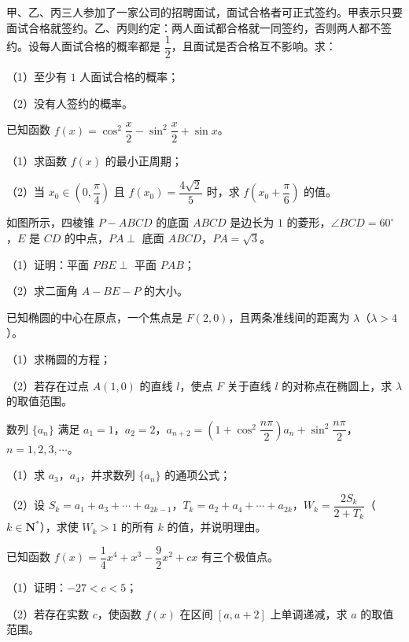 \begin{question}
甲、乙、丙三人参加了一家公司的招聘面试，面试合格者可正式签约。甲表示只要面试合格就签约。乙、丙则约定：两人面试都合格就一同签约，否则两人都不签约。设每人面试合格的概率都是 $\dfrac12$，且面试是否合格互不影响。求：

（1）至少有 $1$ 人面试合格的概率；

（2）没有人签约的概率。

\end{question}
\begin{question}
已知函数 $f(x)=\cos^2\dfrac x2-\sin^2\dfrac x2+\sin x$。

（1）求函数 $f(x)$ 的最小正周期；

（2）当 $x_0\in\left(0,\dfrac{\pi}4\right)$ 且 $f(x_0)=\dfrac{4\sqrt2}5$ 时，求 $f\left(x_0+\dfrac{\pi}6\right)$ 的值。

\Needspace{0.4\textheight}
\end{question}
\begin{question}
如图所示，四棱锥 $P-ABCD$ 的底面 $ABCD$ 是边长为 $1$ 的菱形，$\angle BCD=60^\circ$，$E$ 是 $CD$ 的中点，$PA\perp$ 底面 $ABCD$，$PA=\sqrt3$。

（1）证明：平面 $PBE\perp$ 平面 $PAB$；

（2）求二面角 $A-BE-P$ 的大小。
\nopagebreak[4]
\begin{center}\end{center}
\nopagebreak[4]
\end{question}
\begin{question}
已知椭圆的中心在原点，一个焦点是 $F(2,0)$，且两条准线间的距离为 $\lambda$（$\lambda>4$）。

（1）求椭圆的方程；

（2）若存在过点 $A(1,0)$ 的直线 $l$，使点 $F$ 关于直线 $l$ 的对称点在椭圆上，求 $\lambda$ 的取值范围。

\end{question}
\begin{question}
数列 $\{a_n\}$ 满足 $a_1=1$，$a_2=2$，$a_{n+2}=\left(1+\cos^2\dfrac{n\pi}2\right)a_n+\sin^2\dfrac{n\pi}2$，$n=1,2,3,\cdots$。

（1）求 $a_3$，$a_4$，并求数列 $\{a_n\}$ 的通项公式；

（2）设 $S_k=a_1+a_3+\cdots+a_{2k-1}$，$T_k=a_2+a_4+\cdots+a_{2k}$，$W_k=\dfrac{2S_k}{2+T_k}$（$k\in\mathbf N^*$），求使 $W_k>1$ 的所有 $k$ 的值，并说明理由。

\end{question}
\begin{question}
已知函数 $f(x)=\dfrac14x^4+x^3-\dfrac92x^2+cx$ 有三个极值点。

（1）证明：$-27<c<5$；

（2）若存在实数 $c$，使函数 $f(x)$ 在区间 $[a,a+2]$ 上单调递减，求 $a$ 的取值范围。

\end{question}